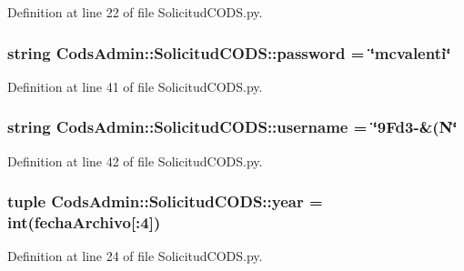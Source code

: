 \-Definition at line 22 of file \-Solicitud\-C\-O\-D\-S.\-py.

\subsubsection[{password}]{\setlength{\rightskip}{0pt plus 5cm}string {\bf \-Cods\-Admin\-::\-Solicitud\-C\-O\-D\-S\-::password} = \char`\"{}mcvalenti\char`\"{}}\label{namespace_cods_admin_1_1_solicitud_c_o_d_s_afbabe49f286d83b412c23f9e726e7cec}


\-Definition at line 41 of file \-Solicitud\-C\-O\-D\-S.\-py.

\subsubsection[{username}]{\setlength{\rightskip}{0pt plus 5cm}string {\bf \-Cods\-Admin\-::\-Solicitud\-C\-O\-D\-S\-::username} = \char`\"{}9\-Fd3-\/\&(\-N\char`\"{}}\label{namespace_cods_admin_1_1_solicitud_c_o_d_s_a99c41d1653dbc65f665d5ca1ae707acf}


\-Definition at line 42 of file \-Solicitud\-C\-O\-D\-S.\-py.

\subsubsection[{year}]{\setlength{\rightskip}{0pt plus 5cm}tuple {\bf \-Cods\-Admin\-::\-Solicitud\-C\-O\-D\-S\-::year} = int({\bf fecha\-Archivo}[\-:4])}\label{namespace_cods_admin_1_1_solicitud_c_o_d_s_ac16785e6db3f1b393651d3bdc223ffb1}


\-Definition at line 24 of file \-Solicitud\-C\-O\-D\-S.\-py.

